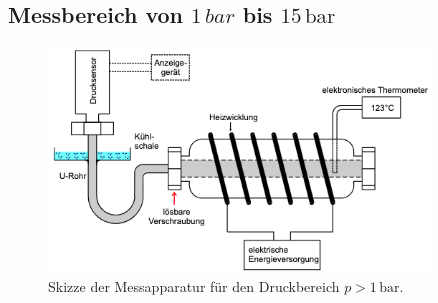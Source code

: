\subsection{Messbereich von $1\,\unit{bar}$ bis $15\, \unit{\bar}$}
\label{sec:ZweiteDurchführung}
\begin{figure}[H]
    \centering
    \includegraphics[width=0.90\textwidth]{Zweite_Apparatur.png}
    \caption{Skizze der Messapparatur für den Druckbereich $p>1\,\unit{\bar}$. \cite{anleitungV203}}
    \label{fig:ZweiteApparatur}
\end{figure}